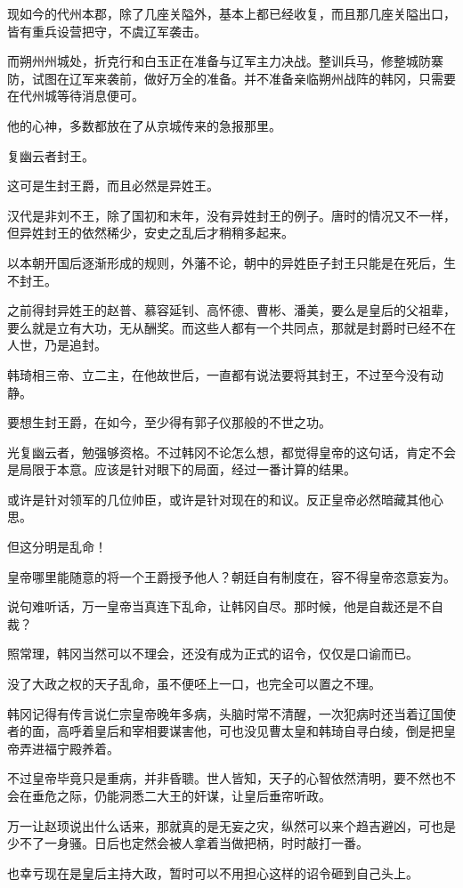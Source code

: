 现如今的代州本郡，除了几座关隘外，基本上都已经收复，而且那几座关隘出口，皆有重兵设营把守，不虞辽军袭击。

而朔州州城处，折克行和白玉正在准备与辽军主力决战。整训兵马，修整城防寨防，试图在辽军来袭前，做好万全的准备。并不准备亲临朔州战阵的韩冈，只需要在代州城等待消息便可。

他的心神，多数都放在了从京城传来的急报那里。

复幽云者封王。

这可是生封王爵，而且必然是异姓王。

汉代是非刘不王，除了国初和末年，没有异姓封王的例子。唐时的情况又不一样，但异姓封王的依然稀少，安史之乱后才稍稍多起来。

以本朝开国后逐渐形成的规则，外藩不论，朝中的异姓臣子封王只能是在死后，生不封王。

之前得封异姓王的赵普、慕容延钊、高怀德、曹彬、潘美，要么是皇后的父祖辈，要么就是立有大功，无从酬奖。而这些人都有一个共同点，那就是封爵时已经不在人世，乃是追封。

韩琦相三帝、立二主，在他故世后，一直都有说法要将其封王，不过至今没有动静。

要想生封王爵，在如今，至少得有郭子仪那般的不世之功。

光复幽云者，勉强够资格。不过韩冈不论怎么想，都觉得皇帝的这句话，肯定不会是局限于本意。应该是针对眼下的局面，经过一番计算的结果。

或许是针对领军的几位帅臣，或许是针对现在的和议。反正皇帝必然暗藏其他心思。

但这分明是乱命！

皇帝哪里能随意的将一个王爵授予他人？朝廷自有制度在，容不得皇帝恣意妄为。

说句难听话，万一皇帝当真连下乱命，让韩冈自尽。那时候，他是自裁还是不自裁？

照常理，韩冈当然可以不理会，还没有成为正式的诏令，仅仅是口谕而已。

没了大政之权的天子乱命，虽不便呸上一口，也完全可以置之不理。

韩冈记得有传言说仁宗皇帝晚年多病，头脑时常不清醒，一次犯病时还当着辽国使者的面，高呼着皇后和宰相要谋害他，可也没见曹太皇和韩琦自寻白绫，倒是把皇帝弄进福宁殿养着。

不过皇帝毕竟只是重病，并非昏聩。世人皆知，天子的心智依然清明，要不然也不会在垂危之际，仍能洞悉二大王的奸谋，让皇后垂帘听政。

万一让赵顼说出什么话来，那就真的是无妄之灾，纵然可以来个趋吉避凶，可也是少不了一身骚。日后也定然会被人拿着当做把柄，时时敲打一番。

也幸亏现在是皇后主持大政，暂时可以不用担心这样的诏令砸到自己头上。

